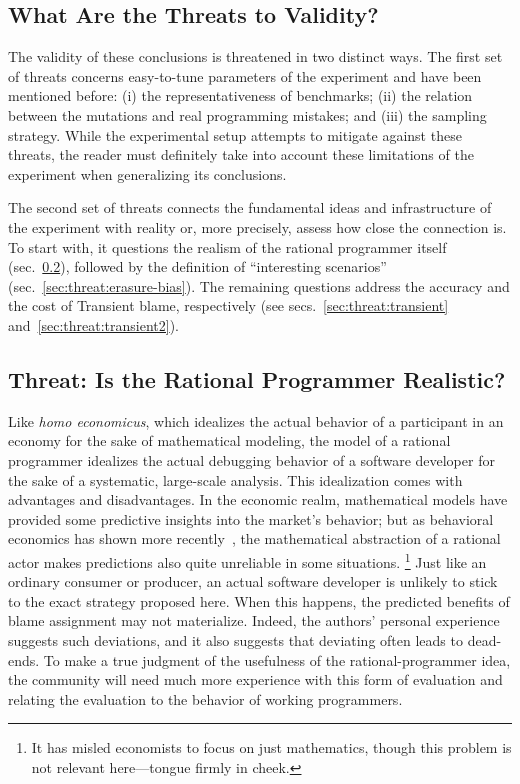 \subsection{What Are the Threats to Validity?}

The validity of these conclusions is threatened in two distinct
ways. The first set of threats concerns easy-to-tune parameters of the
experiment and have been mentioned before: (i) the
representativeness of benchmarks; (ii) the relation between the mutations and real
programming mistakes; and (iii) the sampling strategy.  While the experimental setup attempts to
mitigate against these threats, the reader must definitely take into account
these limitations of the experiment when generalizing its conclusions.

The second set of threats connects the fundamental ideas and infrastructure of the experiment with reality or, more
precisely, assess how close the connection is. To start with, it questions the
realism of the rational programmer itself (sec.~\ref{sub:rational}), followed by
the definition of ``interesting scenarios''
(sec.~\ref{sec:threat:erasure-bias}).  The remaining questions address the
accuracy and the cost of Transient blame, respectively (see
secs.~\ref{sec:threat:transient} and~\ref{sec:threat:transient2}).

\subsection{Threat: Is the Rational Programmer Realistic?} \label{sub:rational}

Like {\em homo economicus\/}, which idealizes the actual behavior of a
participant in an economy for the sake of mathematical modeling, the model of a
rational programmer idealizes the actual debugging behavior of a software
developer for the sake of a systematic, large-scale analysis. This idealization 
comes with advantages and disadvantages. In the economic realm, mathematical
models have provided some predictive insights into the market's behavior; but as
behavioral economics has shown more recently~\cite{henrich2001search},
the mathematical abstraction of a
rational actor makes predictions also quite unreliable in some situations.
\footnote{It has misled economists to focus on just mathematics, though
this problem is not relevant here---tongue firmly in cheek.}  Just like an
ordinary consumer or producer, an actual software developer is unlikely to stick
to the exact strategy proposed here. When this happens, the predicted benefits
of blame assignment may not materialize. Indeed, the authors' personal
experience suggests such deviations, and it also suggests that deviating often leads to dead-ends.
To make a true judgment of the usefulness of the rational-programmer
idea, the community will need much more experience with this form of evaluation
and relating the evaluation to the behavior of working programmers.

